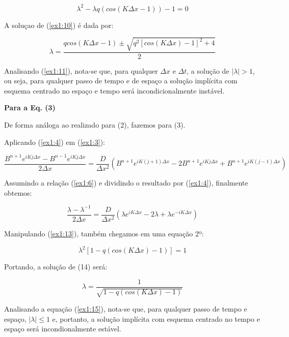 \documentclass[11pt]{article}
\begin{document}
\begin{equation}
    \lambda^{2} - \lambda q(cos(K\Delta{x} -1)) -1 = 0
    \label{ex1:10}
\end{equation}

A soluçao de (\ref{ex1:10}) é dada por:

\begin{equation}
    \lambda = \frac{qcos(K\Delta{x} -1) \pm \sqrt{q^2[cos(K\Delta{x})-1]^2 + 4} }{2}
    \label{ex1:11}
\end{equation}

Analisando (\ref{ex1:11}), nota-se que, para qualquer \(\Delta{x}\) e
\(\Delta{t}\), a solução de \(|\lambda| > 1\), ou seja, para qualquer
passo de tempo e de espaço a solução implícita com esquema centrado no
espaço e tempo será incondicionalmente instável.

\textbf{Para a Eq. (3)}

De forma análoga ao realizado para (2), fazemos para (3).

Aplicando (\ref{ex1:4}) em (\ref{ex1:3}):

\begin{equation}
        \frac{B^{n+1}e^{iKj\Delta{x}} - B^{n-1}e^{iKj\Delta{x}} }{2\Delta{x}} = \frac{D}{\Delta{x^2}}(B^{n+1}e^{iK(j+1)\Delta{x}} - 2B^{n+1}e^{iKj\Delta{x}} + B^{n+1}e^{iK(j-1)\Delta{x}})
        \label{ex1:12}
\end{equation}

Assumindo a relação (\ref{ex1:6}) e dividindo o resultado por
(\ref{ex1:4}), finalmente obtemos:

\begin{equation}
    \frac{\lambda - \lambda^{-1}}{2\Delta{x}} = \frac{D}{\Delta{x^2}}(\lambda e^{iK\Delta{x}} - 2\lambda + \lambda e^{-iK\Delta{x}})
    \label{ex1:13}
\end{equation}

Manipulando (\ref{ex1:13}), também chegamos em uma equação 2º:

\begin{equation}
    \lambda^{2}[1 - q(cos(K\Delta{x}) - 1)] = 1
    \label{ex1:14}
\end{equation}

Portando, a solução de (14) será:

\begin{equation}
    \lambda = \frac{1}{\sqrt{1 - q(cos(K\Delta{x}) - 1)}}
    \label{ex1:15}
\end{equation}

Analisando a equação (\ref{ex1:15}), nota-se que, para qualquer passo de
tempo e espaço, \(|\lambda| \le 1\) e, portanto, a solução implícita com
esquema centrado no tempo e espaço será incondionalmente estável.
\end{document}
